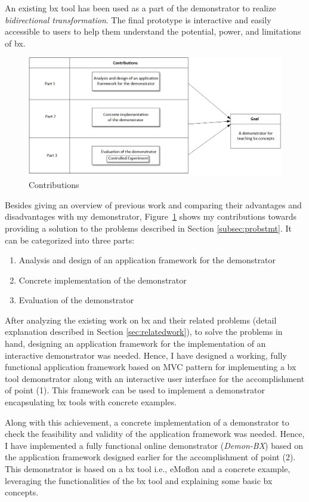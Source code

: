 An existing bx tool has been used as a part of the demonstrator to realize \textit{bidirectional transformation}. The final prototype is interactive and easily accessible to users to help them understand the potential, power, and limitations of bx.

\begin{figure}[h]
	\centering
	\includegraphics[width=1\textwidth]{figures/Contribution}
	\caption{Contributions}
	\label{fig:Contribution}
\end{figure}

Besides giving an overview of previous work and comparing their advantages and disadvantages with my demonstrator, Figure~\ref{fig:Contribution} shows my contributions towards providing a solution to the problems described in Section \ref{subsec:probstmt}. It can be categorized into three parts: 

\begin{enumerate} 
	\item {Analysis and design of an application framework for the demonstrator} 
	\item {Concrete implementation of the demonstrator}
	\item {Evaluation of the demonstrator}
\end{enumerate}

After analyzing the existing work on bx and their related problems (detail explanation described in Section \ref{sec:relatedwork}), to solve the problems in hand, designing an application framework for the implementation of an interactive demonstrator was needed. Hence, I have designed a working, fully functional application framework based on MVC pattern for implementing a bx tool demonstrator along with an interactive user interface for the accomplishment of point (1). This framework can be used to implement a demonstrator encapsulating bx tools with concrete examples.

Along with this achievement, a concrete implementation of a demonstrator to check the feasibility and validity of the application framework was needed. Hence, I have implemented a fully functional online demonstrator (\textit{\ac{Demon-BX}}) based on the application framework designed earlier for the accomplishment of point (2). This demonstrator is based on a bx tool i.e., eMoflon and a concrete example, leveraging the functionalities of the bx tool and explaining some basic bx concepts. 

